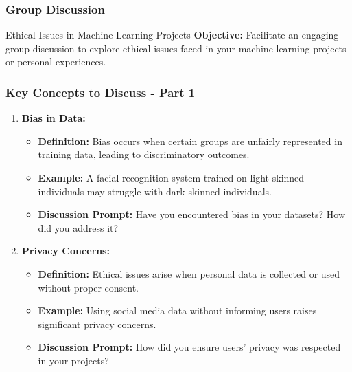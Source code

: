 \documentclass[aspectratio=169]{beamer}
\begin{document}
\begin{frame}[fragile]
    \frametitle{Group Discussion}
    
    \begin{block}{Ethical Issues in Machine Learning Projects}
        \textbf{Objective:} Facilitate an engaging group discussion to explore ethical issues faced in your machine learning projects or personal experiences.
    \end{block}
    
\end{frame}

\begin{frame}[fragile]
    \frametitle{Key Concepts to Discuss - Part 1}
    
    \begin{enumerate}
        \item \textbf{Bias in Data:}
        \begin{itemize}
            \item \textbf{Definition:} Bias occurs when certain groups are unfairly represented in training data, leading to discriminatory outcomes.
            \item \textbf{Example:} A facial recognition system trained on light-skinned individuals may struggle with dark-skinned individuals.
            \item \textbf{Discussion Prompt:} Have you encountered bias in your datasets? How did you address it?
        \end{itemize}
        
        \item \textbf{Privacy Concerns:}
        \begin{itemize}
            \item \textbf{Definition:} Ethical issues arise when personal data is collected or used without proper consent.
            \item \textbf{Example:} Using social media data without informing users raises significant privacy concerns.
            \item \textbf{Discussion Prompt:} How did you ensure users' privacy was respected in your projects?
        \end{itemize}
    \end{enumerate}

\end{frame}
\end{document}
